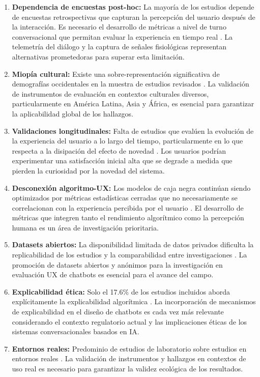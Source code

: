 \documentclass[11pt,twocolumn]{article}
\begin{document}
\begin{enumerate}[leftmargin=*, labelsep=5pt, itemsep=2pt]
    \item \textbf{Dependencia de encuestas post-hoc:} La mayoría de los estudios depende de encuestas retrospectivas que capturan la percepción del usuario después de la interacción. Es necesario el desarrollo de métricas a nivel de turno conversacional que permitan evaluar la experiencia en tiempo real \cite{marconi2026}. La telemetría del diálogo y la captura de señales fisiológicas representan alternativas prometedoras para superar esta limitación.
    
    \item \textbf{Miopía cultural:} Existe una sobre-representación significativa de demografías occidentales en la muestra de estudios revisados \cite{folstad2021}. La validación de instrumentos de evaluación en contextos culturales diversos, particularmente en América Latina, Asia y África, es esencial para garantizar la aplicabilidad global de los hallazgos.
    
    \item \textbf{Validaciones longitudinales:} Falta de estudios que evalúen la evolución de la experiencia del usuario a lo largo del tiempo, particularmente en lo que respecta a la disipación del efecto de novedad \cite{kuhail2022, borsci2022}. Los usuarios podrían experimentar una satisfacción inicial alta que se degrade a medida que pierden la curiosidad por la novedad del sistema.
    
    \item \textbf{Desconexión algoritmo-UX:} Los modelos de caja negra continúan siendo optimizados por métricas estadísticas cerradas que no necesariamente se correlacionan con la experiencia percibida por el usuario \cite{jannach2022}. El desarrollo de métricas que integren tanto el rendimiento algorítmico como la percepción humana es un área de investigación prioritaria.
    
    \item \textbf{Datasets abiertos:} La disponibilidad limitada de datos privados dificulta la replicabilidad de los estudios y la comparabilidad entre investigaciones \cite{fan2023}. La promoción de datasets abiertos y anónimos para la investigación en evaluación UX de chatbots es esencial para el avance del campo.
    
    \item \textbf{Explicabilidad ética:} Solo el 17.6\% de los estudios incluidos aborda explícitamente la explicabilidad algorítmica \cite{marconi2026}. La incorporación de mecanismos de explicabilidad en el diseño de chatbots es cada vez más relevante considerando el contexto regulatorio actual y las implicaciones éticas de los sistemas conversacionales basados en IA.
    
    \item \textbf{Entornos reales:} Predominio de estudios de laboratorio sobre estudios en entornos reales \cite{fan2023, thunstrom2024}. La validación de instrumentos y hallazgos en contextos de uso real es necesario para garantizar la validez ecológica de los resultados.
\end{enumerate}
\end{document}
